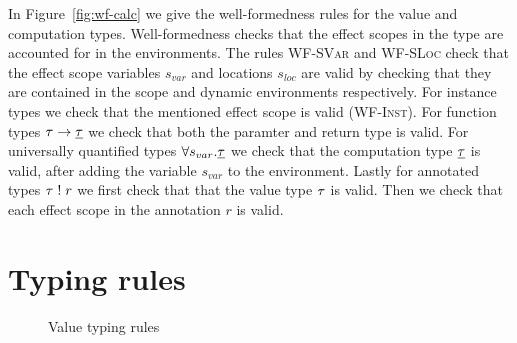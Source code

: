 {In Figure~\ref{fig:wf-calc} we give the well-formedness rules for the value and computation types.
Well-formedness checks that the effect scopes in the type are accounted for in the environments.
The rules \textsc{WF-SVar} and \textsc{WF-SLoc} check that the effect scope variables $s_{var}$ and locations $s_{loc}$ are valid by checking that they are contained in the scope and dynamic environments respectively.
For instance types we check that the mentioned effect scope is valid (\textsc{WF-Inst}).
For function types $\tau \rightarrow \underline{\tau}$ we check that both the paramter and return type is valid.
For universally quantified types $\forall s_{var} . \underline{\tau}$ we check that the computation type $\underline{\tau}$ is valid, after adding the variable $s_{var}$ to the environment.
Lastly for annotated types $\tau \; ! \; r$ we first check that that the value type $\tau$ is valid.
Then we check that each effect scope in the annotation $r$ is valid.

\section{Typing rules}
\label{sec:typingrules}

\begin{figure}[h]
\caption{Value typing rules}
\centering
{}
\end{figure}

}
